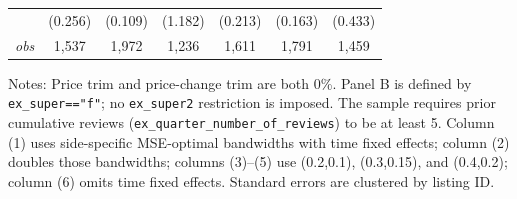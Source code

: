 \begin{table}[!htbp]
\begin{tabular}{lcccccc}
 & (0.256) & (0.109) & (1.182) & (0.213) & (0.163) & (0.433) \\
\textit{obs} & 1,537 & 1,972 & 1,236 & 1,611 & 1,791 & 1,459 \\
\bottomrule
\end{tabular}
\begin{minipage}{0.98\textwidth}\footnotesize
Notes: Price trim and price-change trim are both 0\%. Panel B is defined by \texttt{ex\_super=="f"}; no \texttt{ex\_super2} restriction is imposed. The sample requires prior cumulative reviews (\texttt{ex\_quarter\_number\_of\_reviews}) to be at least 5. Column (1) uses side-specific MSE-optimal bandwidths with time fixed effects; column (2) doubles those bandwidths; columns (3)--(5) use (0.2,0.1), (0.3,0.15), and (0.4,0.2); column (6) omits time fixed effects. Standard errors are clustered by listing ID.
\end{minipage}
\end{table}
